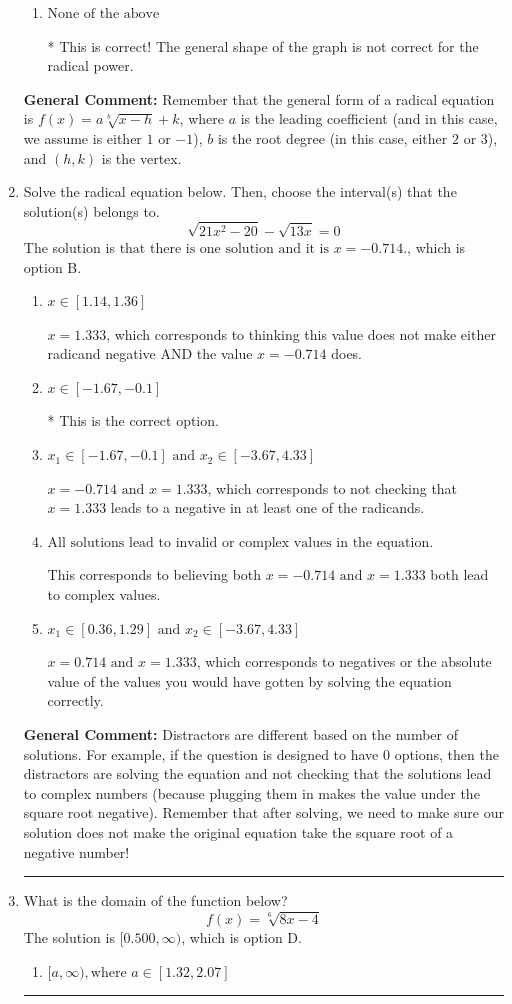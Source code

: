 \documentclass{extbook}[14pt]
\newcommand{\litem}[1]{\item #1

\rule{\textwidth}{0.4pt}}
\begin{document}
\begin{enumerate}
{\begin{enumerate}[label=\Alph*.]
This would be the correct option if the root degree was $2$.
\item \( \text{None of the above} \)

* This is correct! The general shape of the graph is not correct for the radical power.
\end{enumerate}

\textbf{General Comment:} Remember that the general form of a radical equation is $ f(x) = a \sqrt[b]{x - h} + k$, where $a$ is the leading coefficient (and in this case, we assume is either $1$ or $-1$), $b$ is the root degree (in this case, either $2$ or $3$), and $(h, k)$ is the vertex.
}
\litem{
Solve the radical equation below. Then, choose the interval(s) that the solution(s) belongs to.
\[ \sqrt{21 x^2 - 20} - \sqrt{13 x} = 0 \]The solution is \( \text{that there is one solution and it is } x = -0.714. \), which is option B.\begin{enumerate}[label=\Alph*.]
\item \( x \in [1.14,1.36] \)

$x = 1.333$, which corresponds to thinking this value does not make either radicand negative AND the value $x = -0.714$ does.
\item \( x \in [-1.67,-0.1] \)

* This is the correct option.
\item \( x_1 \in [-1.67, -0.1] \text{ and } x_2 \in [-3.67,4.33] \)

$x = -0.714 \text{ and } x = 1.333$, which corresponds to not checking that $x = 1.333$ leads to a negative in at least one of the radicands.
\item \( \text{All solutions lead to invalid or complex values in the equation.} \)

This corresponds to believing both $x = -0.714 \text{ and } x = 1.333$ both lead to complex values.
\item \( x_1 \in [0.36, 1.29] \text{ and } x_2 \in [-3.67,4.33] \)

$x = 0.714 \text{ and } x = 1.333$, which corresponds to negatives or the absolute value of the values you would have gotten by solving the equation correctly.
\end{enumerate}

\textbf{General Comment:} Distractors are different based on the number of solutions. For example, if the question is designed to have 0 options, then the distractors are solving the equation and not checking that the solutions lead to complex numbers (because plugging them in makes the value under the square root negative). Remember that after solving, we need to make sure our solution does not make the original equation take the square root of a negative number!
}
\litem{
What is the domain of the function below?
\[ f(x) = \sqrt[6]{8 x - 4} \]The solution is \( [0.500, \infty) \), which is option D.\begin{enumerate}[label=\Alph*.]
\item \( [a, \infty), \text{where } a \in [1.32, 2.07] \)


\end{enumerate}}
\end{enumerate}
\end{document}
